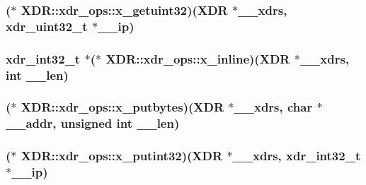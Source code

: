 \hypertarget{structXDR_1_1xdr__ops_a6277de4bae4c953469d7f0530dab8c1a}{
\subsubsection[{x\-\_\-getuint32}]{($\ast$ {\bf \-X\-D\-R\-::xdr\-\_\-ops\-::x\-\_\-getuint32})({\bf \-X\-D\-R} $\ast$\-\_\-\-\_\-xdrs, xdr\-\_\-uint32\-\_\-t $\ast$\-\_\-\-\_\-ip)}}\label{structXDR_1_1xdr__ops_a6277de4bae4c953469d7f0530dab8c1a}
\hypertarget{structXDR_1_1xdr__ops_a9fc8d173a815e617d0b5679d81892311}{
\subsubsection[{x\-\_\-inline}]{\setlength{\rightskip}{0pt plus 5cm}xdr\-\_\-int32\-\_\-t $\ast$($\ast$ {\bf \-X\-D\-R\-::xdr\-\_\-ops\-::x\-\_\-inline})({\bf \-X\-D\-R} $\ast$\-\_\-\-\_\-xdrs, int \-\_\-\-\_\-len)}}\label{structXDR_1_1xdr__ops_a9fc8d173a815e617d0b5679d81892311}
\hypertarget{structXDR_1_1xdr__ops_a7479b63ae6c3f4d177f819145ec98016}{
\subsubsection[{x\-\_\-putbytes}]{($\ast$ {\bf \-X\-D\-R\-::xdr\-\_\-ops\-::x\-\_\-putbytes})({\bf \-X\-D\-R} $\ast$\-\_\-\-\_\-xdrs, char $\ast$\-\_\-\-\_\-addr, unsigned int \-\_\-\-\_\-len)}}\label{structXDR_1_1xdr__ops_a7479b63ae6c3f4d177f819145ec98016}
\hypertarget{structXDR_1_1xdr__ops_a9aca04974e89778f2cdd8cb0c3a09605}{
\subsubsection[{x\-\_\-putint32}]{($\ast$ {\bf \-X\-D\-R\-::xdr\-\_\-ops\-::x\-\_\-putint32})({\bf \-X\-D\-R} $\ast$\-\_\-\-\_\-xdrs, xdr\-\_\-int32\-\_\-t $\ast$\-\_\-\-\_\-ip)}}\label{structXDR_1_1xdr__ops_a9aca04974e89778f2cdd8cb0c3a09605}
